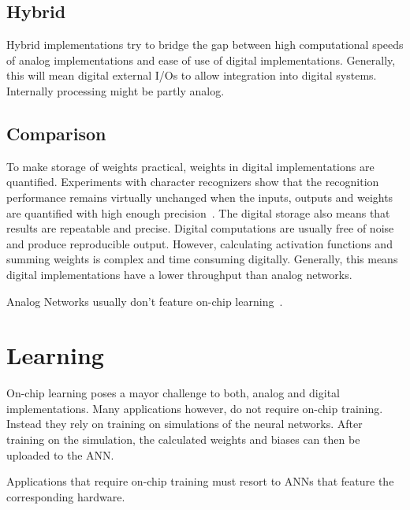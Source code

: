\documentclass[conference]{IEEEtran}
\begin{document}
    \subsection{Hybrid}

    Hybrid implementations try to bridge the gap between high computational speeds of analog implementations and ease of use of digital implementations.
    Generally, this will mean digital external I/Os to allow integration into digital systems.
    Internally processing might be partly analog.

    \subsection{Comparison}

    To make storage of weights practical, weights in digital implementations are quantified.
    Experiments with character recognizers show that the recognition performance remains virtually unchanged when the inputs, outputs and
    weights are quantified with high enough precision~\cite{gupta2015deep}.
    The digital storage also means that results are repeatable and precise.
    Digital computations are usually free of noise and produce reproducible output.
    However, calculating activation functions and summing weights is complex and time consuming digitally.
    Generally, this means digital implementations have a lower throughput than analog networks.

    Analog Networks usually don't feature on-chip learning~\cite{ms1990digital}.

    \section{Learning}

    On-chip learning poses a mayor challenge to both, analog and digital implementations.
    Many applications however, do not require on-chip training.
    Instead they rely on training on simulations of the neural networks.
    After training on the simulation, the calculated weights and biases can then be uploaded to the ANN\@.

    Applications that require on-chip training must resort to ANNs that feature the corresponding hardware.


\end{document}
